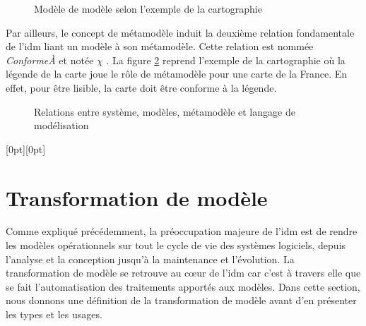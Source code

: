 \begin{figure}[!ht]
    \begin{center}
        
    \end{center}
    \caption{Modèle de modèle selon l'exemple de la cartographie 
    \protect\cite{favre2006ingenierie}}
    \label{fig:modelofmodel}
\end{figure}

Par ailleurs, le concept de métamodèle induit la deuxième relation fondamentale 
de l'\gls{idm} liant un modèle à son métamodèle. Cette relation est nommée 
\textit{ConformeÀ} et notée $\chi$ \cite{bezivin2004search} 
\cite{favre2004towards}. La figure \ref{fig:carteFavre} reprend l'exemple de la 
cartographie où la légende de la carte joue le rôle de métamodèle pour 
une carte de la France. En effet, pour être lisible, la carte doit être conforme 
à la légende.

\begin{figure}[!ht]
 \begin{center}
 
 \end{center}
 \caption{Relations entre système, modèles, métamodèle et langage de 
modélisation \protect\cite{favre2006ingenierie}}
 \label{fig:carteFavre}
\end{figure}

\raisebox{5mm}[0pt][0pt]{%
}

\section{Transformation de modèle}
Comme expliqué précédemment, la préoccupation majeure de l'\gls{idm} est de 
rendre les modèles opérationnels sur tout le cycle de vie des systèmes 
logiciels, depuis l'analyse et la conception jusqu'à la maintenance et 
l'évolution. La transformation de modèle se retrouve au cœur de l'\gls{idm} car 
c'est à travers elle que se fait l'automatisation des traitements apportés aux 
modèles. Dans cette section, nous donnons une définition de la 
transformation de modèle avant d'en présenter les types et les usages.

